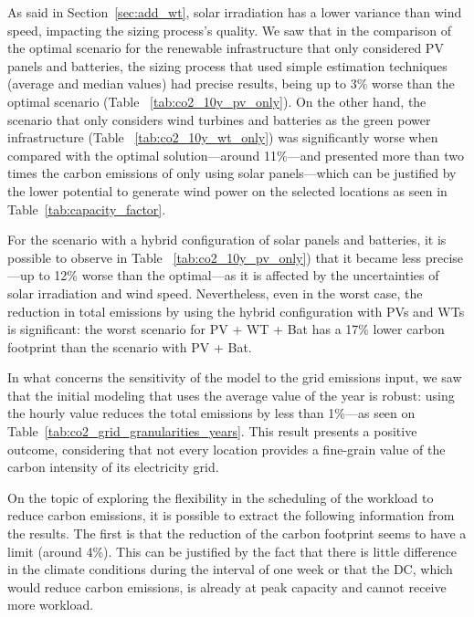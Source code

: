 
As said in Section~\ref{sec:add_wt}, solar irradiation has a lower variance than wind speed, impacting the sizing process's quality. We saw that in the comparison of the optimal scenario for the renewable infrastructure that only considered PV panels and batteries, the sizing process that used simple estimation techniques (average and median values) had precise results, being up to 3\% worse than the optimal scenario (Table ~\ref{tab:co2_10y_pv_only}). On the other hand, the scenario that only considers wind turbines and batteries as the green power infrastructure (Table ~\ref{tab:co2_10y_wt_only}) was significantly worse when compared with the optimal solution---around 11\%---and presented more than two times the carbon emissions of only using solar panels---which can be justified by the lower potential to generate wind power on the selected locations as seen in Table~\ref{tab:capacity_factor}. 

For the scenario with a hybrid configuration of solar panels and batteries, it is possible to observe in Table ~\ref{tab:co2_10y_pv_only}) that it became less precise---up to 12\% worse than the optimal---as it is affected by the uncertainties of solar irradiation and wind speed. Nevertheless, even in the worst case, the reduction in total  emissions by using the hybrid configuration with PVs and WTs is significant: the worst scenario for PV + WT + Bat has a 17\% lower carbon footprint than the scenario with PV + Bat.


In what concerns the sensitivity of the model to the grid emissions input, we saw that the initial modeling that uses the average value of the year is robust: using the hourly value reduces the total  emissions by less than 1\%---as seen on Table~\ref{tab:co2_grid_granularities_years}. This result presents a positive outcome, considering that not every location provides a fine-grain value of the carbon intensity of its electricity grid.

On the topic of exploring the flexibility in the scheduling of the workload to reduce carbon emissions, it is possible to extract the following information from the results. The first is that the reduction of the carbon footprint seems to have a limit (around 4\%). This can be justified by the fact that there is little difference in the climate conditions during the interval of one week or that the DC, which would reduce carbon emissions, is already at peak capacity and cannot receive more workload. 

